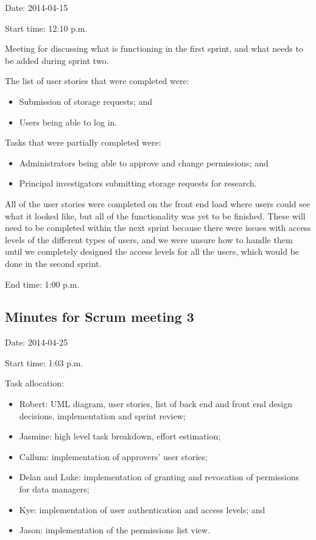 \documentclass[a4paper,titlepage,12pt]{article}
\begin{document}
Date: 2014-04-15

Start time: 12:10 p.m.

Meeting for discussing what is functioning in the first sprint, and what needs
to be added during sprint two.

The list of user stories that were completed were:

\begin{itemize}
	\item Submission of storage requests; and
	\item Users being able to log in.
\end{itemize}

Tasks that were partially completed were:

\begin{itemize}
	\item Administrators being able to approve and change permissions; and
	\item Principal investigators submitting storage requests for research.
\end{itemize}

All of the user stories were completed on the front end load where users could
see what it looked like, but all of the functionality was yet to be finished.
These will need to be completed within the next sprint because there were
issues with access levels of the different types of users, and we were unsure
how to handle them until we completely designed the access levels for all the
users, which would be done in the second sprint.

End time: 1:00 p.m.

\subsection{Minutes for Scrum meeting 3}

Date: 2014-04-25

Start time: 1:03 p.m.

Task allocation:

\begin{itemize}
	\item Robert: UML diagram, user stories, list of back end and front end
	      design decisions, implementation and sprint review;
	\item Jasmine: high level task breakdown, effort estimation;
	\item Callum: implementation of approvers' user stories;
	\item Delan and Luke: implementation of granting and revocation of
	      permissions for data managers;
	\item Kye: implementation of user authentication and access levels; and
	\item Jason: implementation of the permissions list view.
\end{itemize}
\end{document}
